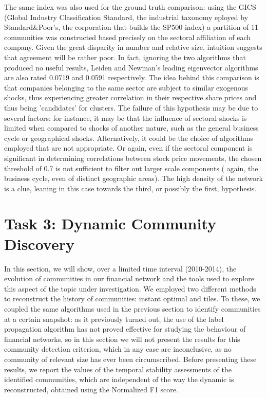 \documentclass[sigchi]{acmart}
\begin{document}
The same index was also used for the ground truth comparison: using the GICS (Global Industry Classification Standard, the industrial taxonomy eployed by Standard&Poor's, the corporation that builds the SP500 index) a partition of 11 communities was constructed based precisely on the sectoral affiliation of each company. Given the great disparity in number and relative size, intuition suggests that agreement will be rather poor.
In fact, ignoring the two algorithms that produced no useful results, Leiden and Newman's leading eigenvector algorithms are also rated 0.0719 and 0.0591 respectively.
The idea behind this comparison is that companies belonging to the same sector are subject to similar exogenous shocks, thus experiencing greater correlation in their respective share prices and thus being 'candidates' for clusters. 
The failure of this hypothesis may be due to several factors: for instance, it may be that the influence of sectoral shocks is limited when compared to shocks of another nature, such as the general business cycle or geographical shocks. Alternatively, it could be the choice of algorithms employed that are not appropriate. Or again, even if the sectoral component is significant in determining correlations between stock price movements, the chosen threshold of 0.7 is not sufficient to filter out larger scale components ( again, the business cycle, even of distinct geographic areas). The high density of the network is a clue, leaning in this case towards the third, or possibly the first, hypothesis.


\section{Task 3: Dynamic Community Discovery}
In this section, we will show, over a limited time interval (2010-2014), the evolution of communities in our financial network and the tools used to explore this aspect of the topic under investigation. 
We employed two different methods to reconstruct the history of communities: instant optimal and tiles. To these, we coupled the same algorithms used in the previous section to identify communities at a certain snapshot: as it previously turned out, the use of the label propagation algorithm has not proved effective for studying the behaviour of financial networks, so in this section we will not present the results for this community detection criterion, which in any case are inconclusive, as no community of relevant size has ever been circumscribed.
Before presenting these results, we report the values of the temporal stability assessments of the identified communities, which are independent of the way the dynamic is reconstructed, obtained using the Normalized F1 score.
\end{document}

